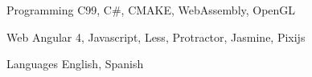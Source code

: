 

\begin{cvskills}

  \cvskill
    {Programming} %
    {C99, C\#, CMAKE, WebAssembly, OpenGL} %

  \cvskill
    {Web} %
    {Angular 4, Javascript, Less, Protractor, Jasmine, Pixijs} %

  \cvskill
    {Languages} %
    {English, Spanish} %

\end{cvskills}
